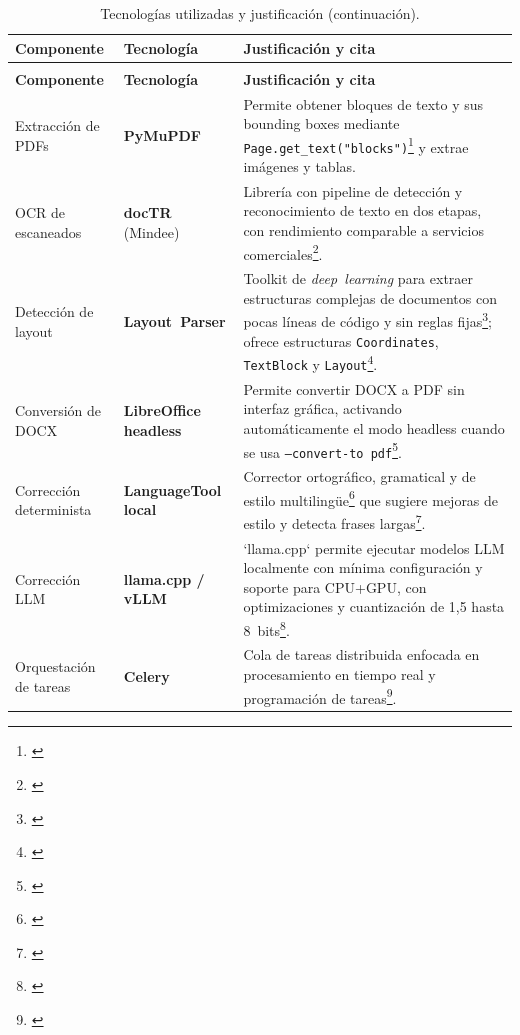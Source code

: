 \documentclass[12pt]{article}
\newcommand{\tcite}[1]{\footnote{\textnormal{\detokenize{#1}}}}
\begin{document}
\begin{longtable}{>{\raggedright\arraybackslash}p{3.5cm}p{3.5cm}p{6cm}}
  \caption{Tecnologías utilizadas y justificación.}\label{tab:tecnologias}\\
  \toprule
  \textbf{Componente} & \textbf{Tecnología} & \textbf{Justificación y cita} \\
  \midrule
  \endfirsthead
  \caption[]{Tecnologías utilizadas y justificación (continuación).}\\
  \toprule
  \textbf{Componente} & \textbf{Tecnología} & \textbf{Justificación y cita} \\
  \midrule
  \endhead
  \bottomrule
  \endfoot
  Extracción de PDFs & \textbf{PyMuPDF} & Permite obtener bloques de texto y sus bounding boxes mediante \texttt{Page.get\_text("blocks")}\tcite{【915511594145204†L134-L142】} y extrae imágenes y tablas. \\
  \addlinespace
  OCR de escaneados & \textbf{docTR} (Mindee) & Librería con pipeline de detección y reconocimiento de texto en dos etapas, con rendimiento comparable a servicios comerciales\tcite{【191659958827309†L64-L73】}. \\
  \addlinespace
  Detección de layout & \textbf{Layout Parser} & Toolkit de \emph{deep learning} para extraer estructuras complejas de documentos con pocas líneas de código y sin reglas fijas\tcite{【964225940706161†L47-L52】}; ofrece estructuras \texttt{Coordinates}, \texttt{TextBlock} y \texttt{Layout}\tcite{【964225940706161†L72-L76】}. \\
  \addlinespace
  Conversión de DOCX & \textbf{LibreOffice headless} & Permite convertir DOCX a PDF sin interfaz gráfica, activando automáticamente el modo headless cuando se usa \texttt{--convert-to pdf}\tcite{【333465169400446†L90-L98】}. \\
  \addlinespace
  Corrección determinista & \textbf{LanguageTool local} & Corrector ortográfico, gramatical y de estilo multilingüe\tcite{【209408010763411†L104-L106】} que sugiere mejoras de estilo y detecta frases largas\tcite{【209408010763411†L134-L139】}. \\
  \addlinespace
  Corrección LLM & \textbf{llama.cpp / vLLM} & `llama.cpp` permite ejecutar modelos LLM localmente con mínima configuración y soporte para CPU+GPU, con optimizaciones y cuantización de 1,5 hasta 8 bits\tcite{【949920289085484†L520-L537】}. \\
  \addlinespace
  Orquestación de tareas & \textbf{Celery} & Cola de tareas distribuida enfocada en procesamiento en tiempo real y programación de tareas\tcite{【227726339796927†L13-L19】}. \\

\end{longtable}
\end{document}
